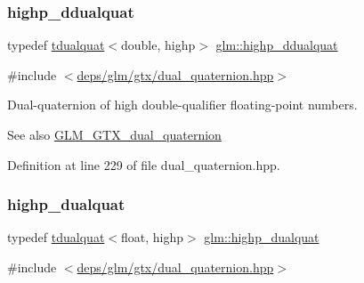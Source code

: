 \mbox{\label{group__gtx__dual__quaternion_ga83e4c5d27c8b0a264a3f3aed24f3f84e}} 
\subsubsection{\texorpdfstring{highp\+\_\+ddualquat}{highp\_ddualquat}}
{\footnotesize\ttfamily typedef \hyperlink{structglm_1_1tdualquat}{tdualquat}$<$double, highp$>$ \hyperlink{group__gtx__dual__quaternion_ga83e4c5d27c8b0a264a3f3aed24f3f84e}{glm\+::highp\+\_\+ddualquat}}



{\ttfamily \#include $<$\hyperlink{dual__quaternion_8hpp}{deps/glm/gtx/dual\+\_\+quaternion.\+hpp}$>$}

Dual-\/quaternion of high double-\/qualifier floating-\/point numbers.

\begin{DoxySeeAlso}{See also}
\hyperlink{group__gtx__dual__quaternion}{G\+L\+M\+\_\+\+G\+T\+X\+\_\+dual\+\_\+quaternion} 
\end{DoxySeeAlso}


Definition at line 229 of file dual\+\_\+quaternion.\+hpp.

\mbox{\label{group__gtx__dual__quaternion_ga98557c3577757f2ced8f35b1de7fa234}} 
\subsubsection{\texorpdfstring{highp\+\_\+dualquat}{highp\_dualquat}}
{\footnotesize\ttfamily typedef \hyperlink{structglm_1_1tdualquat}{tdualquat}$<$float, highp$>$ \hyperlink{group__gtx__dual__quaternion_ga98557c3577757f2ced8f35b1de7fa234}{glm\+::highp\+\_\+dualquat}}



{\ttfamily \#include $<$\hyperlink{dual__quaternion_8hpp}{deps/glm/gtx/dual\+\_\+quaternion.\+hpp}$>$}

